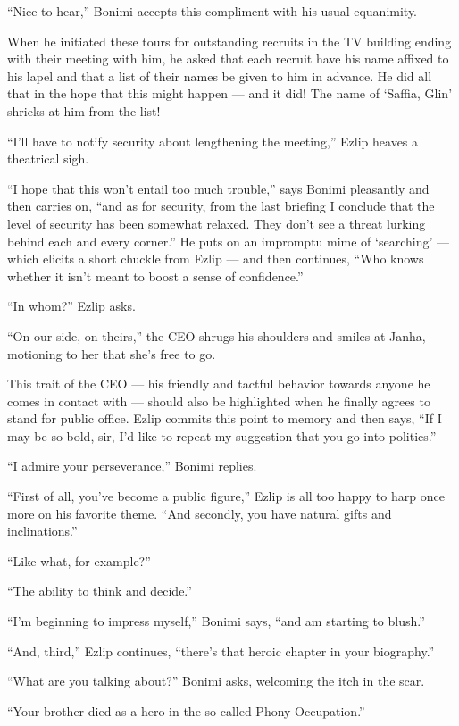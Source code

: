 \documentclass[twoside,11pt,openany]{book}
\begin{document}
``Nice to hear,'' Bonimi accepts this compliment with his usual equanimity.

When he initiated these tours for outstanding recruits in the TV building ending with their meeting with him, he
asked that each recruit have his name affixed to his lapel and that a list of their names be given to him in advance.
He did all that in the hope that this might  happen --- and{ }it did! The name
of `Saffia, Glin' shrieks at him from the list!

``I'll have to notify security about lengthening the meeting,'' Ezlip heaves a theatrical
sigh.

``I hope that this won't entail too much trouble,'' says Bonimi pleasantly and then carries
on, ``and as for security, from the last briefing I conclude that the level of security has been
somewhat relaxed. They don't see a threat lurking behind each and every corner.'' He puts on an impromptu
mime of `searching' --- which elicits a short chuckle from Ezlip --- and then continues, ``Who knows
whether it isn't meant to boost a sense of confidence.''

``In whom?'' Ezlip asks.

``On our side, on theirs,'' the CEO shrugs his shoulders and smiles
at Janha, motioning to her that she's free to go.

This trait of the CEO --- his friendly and tactful behavior towards anyone he comes in contact with --- should also be
highlighted when he finally agrees to stand for public office.  Ezlip commits this point to memory and then says,
``If I may be so bold, sir, I'd like to repeat my suggestion that you go into politics.''

``I admire your perseverance,'' Bonimi replies.

``First of all, you've become a public figure,'' Ezlip is all too happy to harp once more
on his favorite theme. ``And secondly, you have natural gifts and inclinations.''

``Like what, for example?''

``The ability to think and decide.''

``I'm beginning to impress myself,'' Bonimi says, ``and am starting to
blush.''

``And, third,'' Ezlip continues, ``there's that heroic chapter in your
biography.''

``What are you talking about?'' Bonimi asks, welcoming the itch in the scar.

``Your brother died as a hero in the so-called Phony Occupation.''
\end{document}
